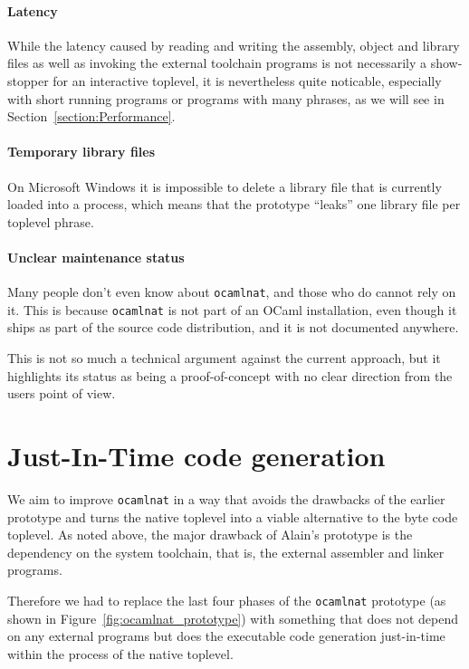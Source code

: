 \documentclass[10pt,a4paper,final,twocolumn]{article}
\begin{document}
\paragraph{Latency}

While the latency caused by reading and writing the assembly, object and library files as well as invoking the
external toolchain programs is not necessarily a show-stopper for an interactive toplevel, it is nevertheless
quite noticable, especially with short running programs or programs with many phrases, as we will see in
Section~\ref{section:Performance}.

\paragraph{Temporary library files}

On Microsoft Windows it is impossible to delete a library file that is currently loaded into a process, which
means that the prototype ``leaks'' one library file per toplevel phrase.

\paragraph{Unclear maintenance status}

Many people don't even know about \texttt{ocamlnat}, and those who do cannot rely on it. This is because
\texttt{ocamlnat} is not part of an OCaml installation, even though it ships as part of the source code
distribution, and it is not documented anywhere.

This is not so much a technical argument against the current approach, but it highlights its status as
being a proof-of-concept with no clear direction from the users point of view.


\section{Just-In-Time code generation} \label{section:Just_In_Time_code_generation}

We aim to improve \texttt{ocamlnat} in a way that avoids the drawbacks of the earlier prototype
and turns the native toplevel into a viable alternative to the byte code toplevel. As noted above,
the major drawback of Alain's prototype is the dependency on the system toolchain, that is, the
external assembler and linker programs.

Therefore we had to replace the last four phases of the \texttt{ocamlnat} prototype (as shown in
Figure~\ref{fig:ocamlnat_prototype}) with something that does not depend on any external programs
but does the executable code generation just-in-time within the process of the native toplevel.
\end{document}
